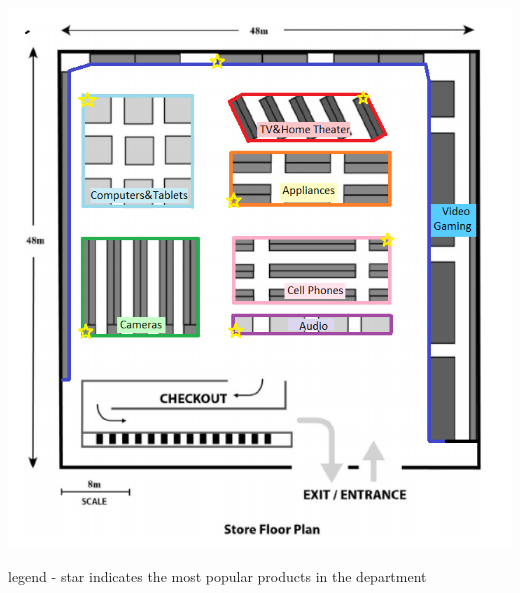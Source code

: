 \begin{center}
    \includegraphics[width=\textwidth]{fig4.4.PNG}
\end{center}

legend - star indicates the most popular products in the department